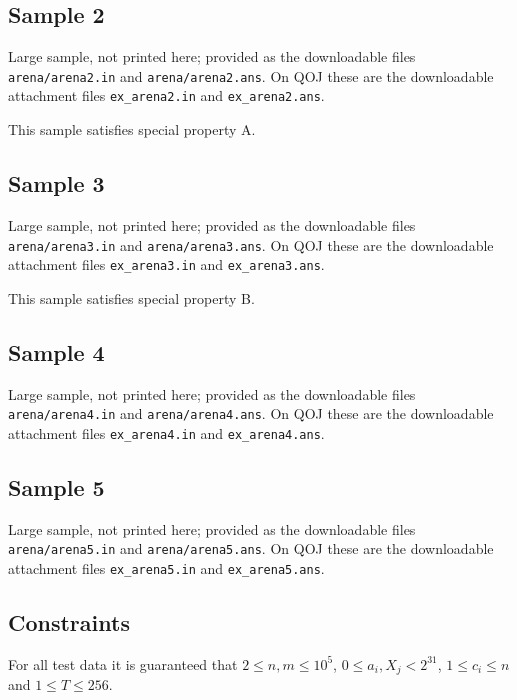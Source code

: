 \documentclass[11pt]{article}
\begin{document}
\subsection*{Sample 2}

Large sample, not printed here;
provided as the downloadable files \texttt{arena/arena2.in} and \texttt{arena/arena2.ans}.
On QOJ these are the downloadable attachment files \texttt{ex\_arena2.in}
and \texttt{ex\_arena2.ans}.

This sample satisfies special property A.

\subsection*{Sample 3}

Large sample, not printed here;
provided as the downloadable files \texttt{arena/arena3.in} and \texttt{arena/arena3.ans}.
On QOJ these are the downloadable attachment files \texttt{ex\_arena3.in}
and \texttt{ex\_arena3.ans}.

This sample satisfies special property B.

\subsection*{Sample 4}

Large sample, not printed here;
provided as the downloadable files \texttt{arena/arena4.in} and \texttt{arena/arena4.ans}.
On QOJ these are the downloadable attachment files \texttt{ex\_arena4.in}
and \texttt{ex\_arena4.ans}.

\subsection*{Sample 5}

Large sample, not printed here;
provided as the downloadable files \texttt{arena/arena5.in} and \texttt{arena/arena5.ans}.
On QOJ these are the downloadable attachment files \texttt{ex\_arena5.in}
and \texttt{ex\_arena5.ans}.

\subsection*{Constraints}

For all test data it is guaranteed that $2 \le n, m \le 10^5$,
$0 \le a_i, X_j < 2^{31}$, $1 \le c_i \le n$ and $1 \le T \le 256$.
\end{document}

